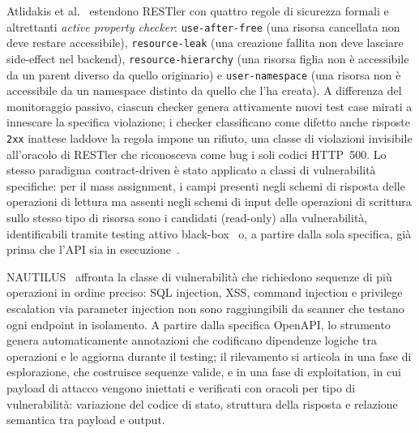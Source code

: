 Atlidakis et al.~\cite{atlidakisCheckingSecurityProperties2020} estendono RESTler con quattro regole di sicurezza formali e altrettanti \emph{active property checker}: \texttt{use-after-free} (una risorsa cancellata non deve restare accessibile), \texttt{resource-leak} (una creazione fallita non deve lasciare side-effect nel backend), \texttt{resource-hierarchy} (una risorsa figlia non è accessibile da un parent diverso da quello originario) e \texttt{user-namespace} (una risorsa non è accessibile da un namespace distinto da quello che l'ha creata). A differenza del monitoraggio passivo, ciascun checker genera attivamente nuovi test case mirati a innescare la specifica violazione; i checker classificano come difetto anche risposte \texttt{2xx} inattese laddove la regola impone un rifiuto, una classe di violazioni invisibile all'oracolo di RESTler che riconosceva come bug i soli codici HTTP~500. Lo stesso paradigma contract-driven è stato applicato a classi di vulnerabilità specifiche: per il mass assignment, i campi presenti negli schemi di risposta delle operazioni di lettura ma assenti negli schemi di input delle operazioni di scrittura sullo stesso tipo di risorsa sono i candidati (read-only) alla vulnerabilità, identificabili tramite testing attivo black-box~\cite{corradiniAutomatedBlackBoxTesting2023} o, a partire dalla sola specifica, già prima che l'API sia in esecuzione~\cite{corradiniRESTAPIs2024}.

NAUTILUS~\cite{dengNAUTILUSAutomatedRESTful2023} affronta la classe di vulnerabilità che richiedono sequenze di più operazioni in ordine preciso: SQL injection, XSS, command injection e privilege escalation via parameter injection non sono raggiungibili da scanner che testano ogni endpoint in isolamento. A partire dalla specifica OpenAPI, lo strumento genera automaticamente annotazioni che codificano dipendenze logiche tra operazioni e le aggiorna durante il testing; il rilevamento si articola in una fase di esplorazione, che costruisce sequenze valide, e in una fase di exploitation, in cui payload di attacco vengono iniettati e verificati con oracoli per tipo di vulnerabilità: variazione del codice di stato, struttura della risposta e relazione semantica tra payload e output.

